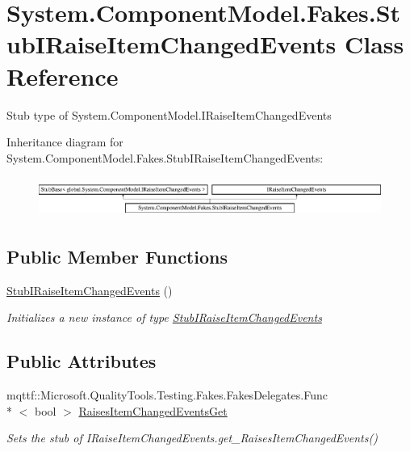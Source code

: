 \hypertarget{class_system_1_1_component_model_1_1_fakes_1_1_stub_i_raise_item_changed_events}{\section{System.\-Component\-Model.\-Fakes.\-Stub\-I\-Raise\-Item\-Changed\-Events Class Reference}
\label{class_system_1_1_component_model_1_1_fakes_1_1_stub_i_raise_item_changed_events}
}


Stub type of System.\-Component\-Model.\-I\-Raise\-Item\-Changed\-Events 


Inheritance diagram for System.\-Component\-Model.\-Fakes.\-Stub\-I\-Raise\-Item\-Changed\-Events\-:\begin{figure}[H]
\begin{center}
\leavevmode
\includegraphics[height=1.314554cm]{class_system_1_1_component_model_1_1_fakes_1_1_stub_i_raise_item_changed_events}
\end{center}
\end{figure}
\subsection*{Public Member Functions}
\begin{DoxyCompactItemize}
\item 
\hyperlink{class_system_1_1_component_model_1_1_fakes_1_1_stub_i_raise_item_changed_events_a25915f83b8b652728e11d82830207e46}{Stub\-I\-Raise\-Item\-Changed\-Events} ()
\begin{DoxyCompactList}\small\item\em Initializes a new instance of type \hyperlink{class_system_1_1_component_model_1_1_fakes_1_1_stub_i_raise_item_changed_events}{Stub\-I\-Raise\-Item\-Changed\-Events}\end{DoxyCompactList}\end{DoxyCompactItemize}
\subsection*{Public Attributes}
\begin{DoxyCompactItemize}
\item 
mqttf\-::\-Microsoft.\-Quality\-Tools.\-Testing.\-Fakes.\-Fakes\-Delegates.\-Func\\*
$<$ bool $>$ \hyperlink{class_system_1_1_component_model_1_1_fakes_1_1_stub_i_raise_item_changed_events_ade6d8360375d9288e56e98d136b4847f}{Raises\-Item\-Changed\-Events\-Get}
\begin{DoxyCompactList}\small\item\em Sets the stub of I\-Raise\-Item\-Changed\-Events.\-get\-\_\-\-Raises\-Item\-Changed\-Events()\end{DoxyCompactList}\end{DoxyCompactItemize}


